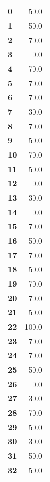 \documentclass[11pt]{article}
\begin{document}
\begin{center}
\begin{longtable}{lr}
\bottomrule
\endlastfoot
\textbf{0 } &                  50.0 \\
\textbf{1 } &                  50.0 \\
\textbf{2 } &                  70.0 \\
\textbf{3 } &                   0.0 \\
\textbf{4 } &                  70.0 \\
\textbf{5 } &                  70.0 \\
\textbf{6 } &                  70.0 \\
\textbf{7 } &                  30.0 \\
\textbf{8 } &                  70.0 \\
\textbf{9 } &                  50.0 \\
\textbf{10} &                  70.0 \\
\textbf{11} &                  50.0 \\
\textbf{12} &                   0.0 \\
\textbf{13} &                  30.0 \\
\textbf{14} &                   0.0 \\
\textbf{15} &                  70.0 \\
\textbf{16} &                  50.0 \\
\textbf{17} &                  70.0 \\
\textbf{18} &                  50.0 \\
\textbf{19} &                  70.0 \\
\textbf{20} &                  70.0 \\
\textbf{21} &                  50.0 \\
\textbf{22} &                 100.0 \\
\textbf{23} &                  70.0 \\
\textbf{24} &                  70.0 \\
\textbf{25} &                  50.0 \\
\textbf{26} &                   0.0 \\
\textbf{27} &                  30.0 \\
\textbf{28} &                  70.0 \\
\textbf{29} &                  50.0 \\
\textbf{30} &                  30.0 \\
\textbf{31} &                  50.0 \\
\textbf{32} &                  50.0 \\

\end{longtable}
\end{center}
\end{document}
